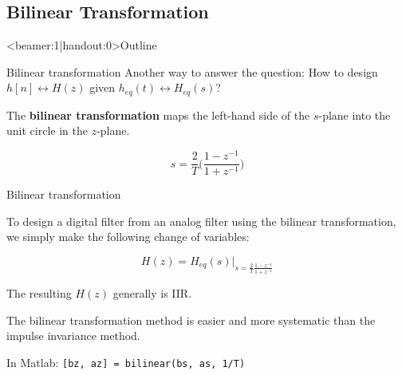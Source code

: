 \documentclass[10pt, aspectratio=169]{beamer}
\begin{document}
%
\subsection{Bilinear Transformation}
\begin{frame}<beamer:1|handout:0>{Outline} 
\tableofcontents[currentsubsection]
\end{frame}

%
\begin{frame}{Bilinear transformation}
Another way to answer the question: How to design $h[n] \longleftrightarrow H(z)$ given $h_{eq}(t) \longleftrightarrow H_{eq}(s)$?

The \textbf{bilinear transformation} maps the left-hand side of the $s$-plane into the unit circle in the $z$-plane.
	
\begin{equation*}
	s = \frac{2}{T}\bigg(\frac{1 - z^{-1}}{1 + z^{-1}}\bigg) \tag{Bilinear transformation}
\end{equation*}

\begin{center}
	\resizebox{0.75\linewidth}{!}{}
\end{center}	
\end{frame}

\begin{frame}{Bilinear transformation}

To design a digital filter from an analog filter using the bilinear transformation, we simply make the following change of variables:

\begin{equation*}
H(z) = H_{eq}(s)\bigg|_{\displaystyle s = \frac{2}{T}\frac{1 - z^{-1}}{1 + z^{-1}}}
\end{equation*}

The resulting $H(z)$ generally is IIR.
\vspace{0.25cm}

The bilinear transformation method is easier and more systematic than the impulse invariance method.
\vspace{0.25cm}

In Matlab: \texttt{[bz, az] = bilinear(bs, as, 1/T)}

\end{frame}
\end{document}
